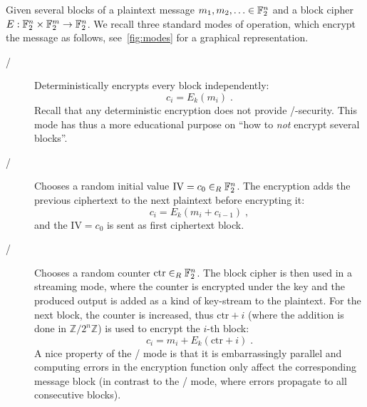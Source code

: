 Given several blocks of a plaintext message $m_1, m_2, \ldots \in \mathbb{F}_2^n$ and a block cipher $E : \mathbb{F}_2^n \times \mathbb{F}_2^m \to \mathbb{F}_2^n$.
We recall three standard modes of operation, which encrypt the message as follows, see~\cref{fig:modes} for a graphical representation.
\begin{description}
    \item[\ECB/] Deterministically encrypts every block independently:
                 \begin{equation*}
                     c_i = E_k(m_i)\;.
                 \end{equation*}
                 Recall that any deterministic encryption does not provide \CPA/-security.
                 This mode has thus a more educational purpose on \enquote{how to \emph{not} encrypt several blocks}.
    \item[\CBC/] Chooses a random initial value $\mathrm{IV} = c_0 \in_R \mathbb{F}_2^n$.
                 The encryption adds the previous ciphertext to the next plaintext before encrypting it:
                 \begin{equation*}
                     c_i = E_k(m_i + c_{i-1})\;,
                 \end{equation*}
                 and the $\mathrm{IV} = c_0$ is sent as first ciphertext block.
    \item[\CTR/] Chooses a random counter $\mathrm{ctr} \in_R \mathbb{F}_2^n$.
                 The block cipher is then used in a streaming mode, where the counter is encrypted under the key and the produced output is added as a kind of key-stream to the plaintext.
                 For the next block, the counter is increased, thus $\mathrm{ctr}+i$ (where the addition is done in $\mathbb{Z}/2^n\mathbb{Z}$) is used to encrypt the $i$-th block:
                 \begin{equation*}
                     c_i = m_i + E_k(\mathrm{ctr}+i)\;.
                 \end{equation*}
                 A nice property of the \CTR/ mode is that it is embarrassingly parallel and computing errors in the encryption function only affect the corresponding message block (in contrast to the \CBC/ mode, where errors propagate to all consecutive blocks).
\end{description}
